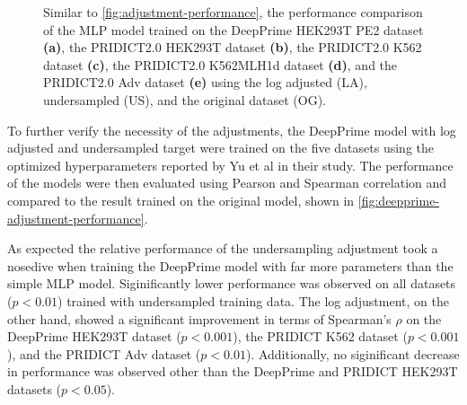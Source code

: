 \begin{figure}
    \centering
    \vspace{-3mm} %
    \vspace{-3mm} %
    \vspace{-3mm} 
    \vspace{-3mm} 
    \vspace{-3mm} 
    \caption{
        Similar to \autoref{fig:adjustment-performance}, the performance comparison of the MLP model trained on the DeepPrime HEK293T PE2 dataset \textbf{(a)}, the PRIDICT2.0 HEK293T dataset \textbf{(b)}, the PRIDICT2.0 K562 dataset \textbf{(c)}, the PRIDICT2.0 K562MLH1d dataset \textbf{(d)}, and the PRIDICT2.0 Adv dataset \textbf{(e)} using the log adjusted (LA), undersampled (US), and the original dataset (OG). 
    }
    \label{fig:deepprime-adjustment-performance}
\end{figure}

To further verify the necessity of the adjustments, the DeepPrime model with log adjusted and undersampled target were trained on the five datasets using the optimized hyperparameters reported by Yu et al in their study\cite{yuPredictionEfficienciesDiverse2023}. The performance of the models were then evaluated using Pearson and Spearman correlation and compared to the result trained on the original model, shown in \autoref{fig:deepprime-adjustment-performance}.

As expected the relative performance of the undersampling adjustment took a nosedive when training the DeepPrime model with far more parameters than the simple MLP model. Siginificantly lower performance was observed on all datasets ($p<0.01$) trained with undersampled training data. The log adjustment, on the other hand, showed a significant improvement in terms of Spearman's $\rho$ on the DeepPrime HEK293T dataset ($p<0.001$), the PRIDICT K562 dataset ($p<0.001$), and the PRIDICT Adv dataset ($p<0.01$). Additionally, no siginificant decrease in performance was observed other than the DeepPrime and PRIDICT HEK293T datasets ($p<0.05$).

